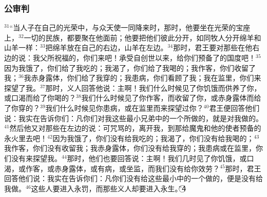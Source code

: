 \subsubsection{公审判}
$^{31}$“当人子在自己的光荣中，与众天使一同降来时，那时，他要坐在光荣的宝座上，$^{32}$一切的民族，都要聚在他面前；他要把他们彼此分开，如同牧人分开绵羊和山羊一样：$^{33}$把绵羊放在自己的右边，山羊在左边。$^{34}$那时，君王要对那些在他右边的说：我父所祝福的，你们来吧！承受自创世以来，给你们预备了的国度吧！$^{35}$因为我饿了，你们给了我吃的；我渴了，你们给了我喝的；我作客，你们收留了我；$^{36}$我赤身露体，你们给了我穿的；我患病，你们看顾了我；我在监里，你们来探望了我。$^{37}$那时，义人回答他说：主啊！我们什么时候见了你饥饿而供养了你，或口渴而给了你喝的？$^{38}$我们什么时候见了你作客，而收留了你，或赤身露体而给了你穿的？$^{39}$我们什么时候见你患病，或在监里而来探望过你？$^{40}$君王便回答他们说：我实在告诉你们：凡你们对我这些最小兄弟中的一个所做的，就是对我做的。$^{41}$然后他又对那些在左边的说：可咒骂的，离开我，到那给魔鬼和他的使者预备的永火里去吧！$^{42}$因为我饿了，你们没有给我吃的；我渴了，你们没有给我喝的；$^{43}$我作客，你们没有收留我；我赤身露体，你们没有给我穿的；我患病或在监里，你们没有来探望我。$^{44}$那时，他们也要回答说：主啊！我们几时见了你饥饿，或口渴，或作客，或赤身露体，或有病，或坐监，而我们没有给你效劳？$^{45}$那时，君王回答他们说：我实在告诉你们：凡你们没有给这些最小中的一个做的，便是没有给我做。$^{46}$这些人要进入永罚，而那些义人却要进入永生。”\textcircled{4}